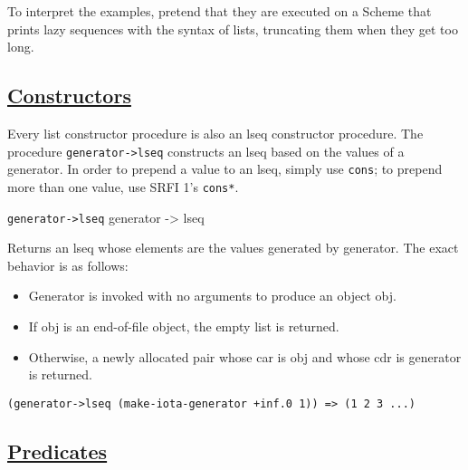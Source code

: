 To interpret the examples, pretend that they are executed on a Scheme
that prints lazy sequences with the syntax of lists, truncating them
when they get too long.

\subsection{\texorpdfstring{\href{}{Constructors}}{Constructors}}\label{constructors}

Every list constructor procedure is also an lseq constructor procedure.
The procedure \texttt{generator-\textgreater{}lseq} constructs an lseq
based on the values of a generator. In order to prepend a value to an
lseq, simply use \texttt{cons}; to prepend more than one value, use SRFI
1's \texttt{cons*}.

\href{}{}

\texttt{generator-\textgreater{}lseq} generator -\textgreater{} lseq

Returns an lseq whose elements are the values generated by generator.
The exact behavior is as follows:

\begin{itemize}
\tightlist
\item
  Generator is invoked with no arguments to produce an object obj.
\item
  If obj is an end-of-file object, the empty list is returned.
\item
  Otherwise, a newly allocated pair whose car is obj and whose cdr is
  generator is returned.
\end{itemize}

\begin{verbatim}
(generator->lseq (make-iota-generator +inf.0 1)) => (1 2 3 ...)
\end{verbatim}

\subsection{\texorpdfstring{\href{}{Predicates}}{Predicates}}\label{predicates}

